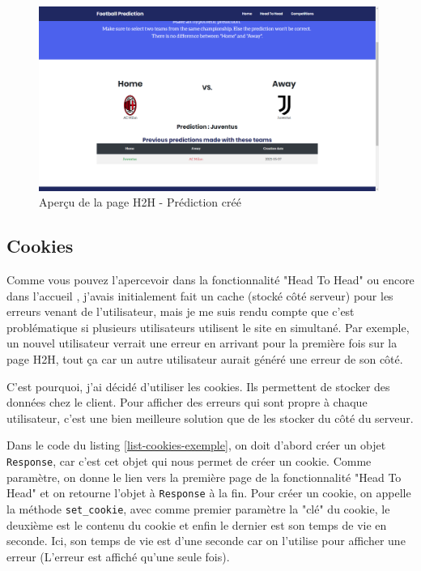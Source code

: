 \documentclass[a4paper,14pt]{extarticle}
\begin{document}
{\begin{figure}[htp]
    \centering
    \includegraphics[width=30em]{../img/predictionMadeH2H.png}
    \caption{Aperçu de la page H2H - Prédiction créé}
    \label{fig:predictionMadeH2H}
\end{figure}

\newpage

\subsection{Cookies}

Comme vous pouvez l'apercevoir dans la fonctionnalité "Head To Head" ou encore dans l'accueil , j'avais initialement fait un cache (stocké côté serveur) pour les erreurs venant de l'utilisateur, mais je me suis rendu compte que c'est problématique si plusieurs utilisateurs utilisent le site en simultané. Par exemple, un nouvel utilisateur verrait une erreur en arrivant pour la première fois sur la page H2H, tout ça car un autre utilisateur aurait généré une erreur de son côté.

C'est pourquoi, j'ai décidé d'utiliser les cookies. Ils permettent de stocker des données chez le client. Pour afficher des erreurs qui sont propre à chaque utilisateur, c'est une bien meilleure solution que de les stocker du côté du serveur.


Dans le code du listing \ref{list-cookies-exemple}, on doit d'abord créer un objet \texttt{Response}, car c'est cet objet qui nous permet de créer un cookie. Comme paramètre, on donne le lien vers la première page de la fonctionnalité "Head To Head" et on retourne l'objet à \texttt{Response} à la fin. Pour créer un cookie, on appelle la méthode \texttt{set\_cookie}, avec comme premier paramètre la "clé" du cookie, le deuxième est le contenu du cookie et enfin le dernier est son temps de vie en seconde. Ici, son temps de vie est d'une seconde car on l'utilise pour afficher une erreur (L'erreur est affiché qu'une seule fois). 

}
\end{document}
